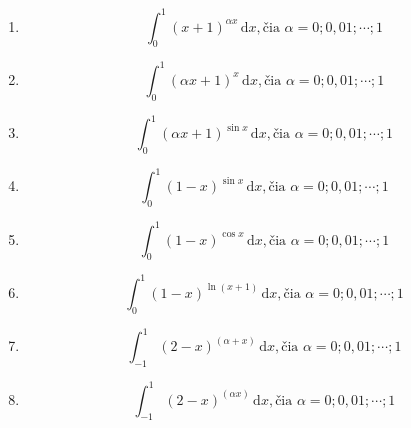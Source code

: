 \documentclass[10pt,a4paper]{article}
\begin{document}
\begin{enumerate}
\item 
\[
 \int_0^1 (x+1)^{\alpha x}\,\mathrm{d}x, \text{čia } \alpha = 0; 0,01; \cdots; 1
\]

\item 
\[
 \int_0^1 (\alpha x+1)^{x}\,\mathrm{d}x, \text{čia } \alpha = 0; 0,01; \cdots; 1
\]

\item 
\[
 \int_0^1 (\alpha x+1)^{\sin x}\,\mathrm{d}x, \text{čia } \alpha = 0; 0,01; \cdots; 1
\]

\item 
\[
 \int_0^1 (1-x)^{\sin x}\,\mathrm{d}x, \text{čia } \alpha = 0; 0,01; \cdots; 1
\]

\item 
\[
 \int_0^1 (1-x)^{\cos x}\,\mathrm{d}x, \text{čia } \alpha = 0; 0,01; \cdots; 1
\]

\item 
\[
 \int_0^1 (1-x)^{\ln (x+1) }\,\mathrm{d}x, \text{čia } \alpha = 0; 0,01; \cdots; 1
\]

\item 
\[
 \int_{-1}^1 (2-x)^{(\alpha + x)}\,\mathrm{d}x, \text{čia } \alpha = 0; 0,01; \cdots; 1
\]

\item 
\[
 \int_{-1}^1 (2-x)^{(\alpha x)}\,\mathrm{d}x, \text{čia } \alpha = 0; 0,01; \cdots; 1
\]



\end{enumerate}
\end{document}

